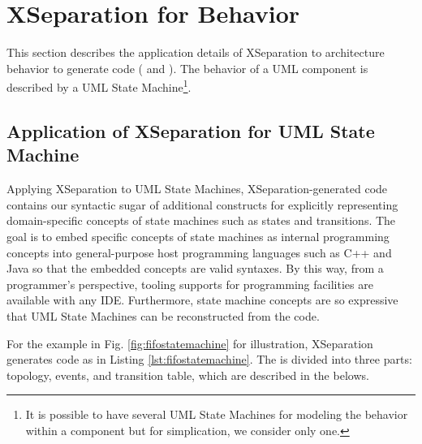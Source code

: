 \section{XSeparation for Behavior}
\label{sec:xseparationbehavior}
This section describes the application details of XSeparation to architecture behavior to generate code ( and ).
The behavior of a UML component is described by a UML State Machine\footnote{It is possible to have several UML State Machines for modeling the behavior within a component but for simplication, we consider only one.}.







\subsection{Application of XSeparation for UML State Machine}

Applying XSeparation to UML State Machines, XSeparation-generated code contains our syntactic sugar of additional constructs for explicitly representing domain-specific concepts of state machines such as states and transitions.
The goal is to embed specific concepts of state machines as internal programming concepts into general-purpose host programming languages such as C++ and Java so that the embedded concepts are valid syntaxes.
By this way, from a programmer's perspective, tooling supports for programming facilities are available with any IDE. 
Furthermore, state machine concepts are so expressive that UML State Machines can be reconstructed from the code.

\begin{minipage}{\columnwidth}
	
\end{minipage}

For the example in Fig. \ref{fig:fifostatemachine} for illustration, XSeparation generates code as in Listing \ref{lst:fifostatemachine}.
The  is divided into three parts: topology, events, and transition table, which are described in the belows.




